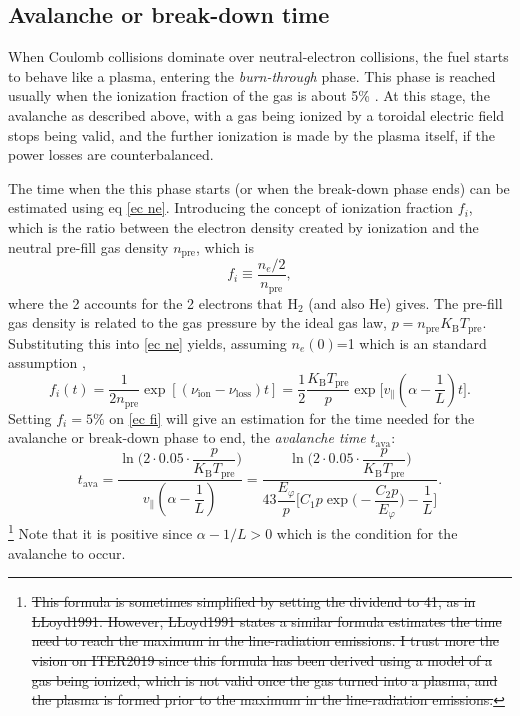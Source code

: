 \documentclass[a4paper,12pt,oneside]{book}
\begin{document}

\subsection{Avalanche or break-down time}

When Coulomb collisions dominate over neutral-electron collisions, the fuel starts to behave like a plasma, entering the \textit{burn-through} phase. This phase is reached usually when the ionization fraction of the gas is about 5\% \cite{ITER_2019}. At this stage, the avalanche as described above, with a gas being ionized by a toroidal electric field stops being valid, and the further ionization is made by the plasma itself, if the power losses are counterbalanced. 

The time when the this phase starts (or when the break-down phase ends) can be estimated using eq \eqref{ec ne}. Introducing the concept of ionization fraction $f_i$, which is the ratio between the electron density created by ionization and the neutral pre-fill gas density $n_\text{pre}$, which is
%
\begin{equation}
f_i \equiv \dfrac{n_e/2}{n_\text{pre}},
\end{equation} 
where the 2 accounts for the 2 electrons that H$_2$ (and also He) gives. The pre-fill gas density is related to the gas pressure by the ideal gas law, $p=n_\text{pre} K_\text{B} T_\text{pre}$. Substituting this into \eqref{ec ne} yields, assuming $n_e(0)$=1 which is an standard assumption \cite{ITER_2019, Lloyd_1991},
%
\begin{equation}\label{ec fi}
f_i(t)=\dfrac{1}{2 n_\text{pre}} \exp{ [(\nu_\text{ion}-\nu_\text{loss})t]}= \dfrac{1}{2} \dfrac{K_\text{B} T_\text{pre}}{p} \exp \Big[v_\parallel (\alpha-\dfrac{1}{L})t \Big].
\end{equation}
Setting $f_i=5\%$ on \eqref{ec fi} will give an estimation for the time needed for the avalanche or break-down phase to end, the \textit{avalanche time} $t_\text{ava}$:
%
\begin{equation}\label{ec t_ava}
t_\text{ava}= \dfrac{\ln \Big(2\cdot 0.05 \cdot \dfrac{p}{K_\text{B} T_\text{pre}} \Big) }{v_\parallel (\alpha-\dfrac{1}{L})}=\dfrac{\ln \Big(2\cdot 0.05 \cdot \dfrac{p}{K_\text{B} T_\text{pre}} \Big) }{43 \dfrac{E_\varphi}{p}\Big[ C_1 p \exp \Big(-\dfrac{C_2 p}{E_\varphi} \Big)-\dfrac{1}{L} \Big]}.
\end{equation}\footnote{\st{This formula is sometimes simplified by setting the dividend to 41, as in LLoyd1991. However, LLoyd1991 states a similar formula estimates the time need to reach the maximum in the line-radiation emissions. I trust more the vision on ITER2019 since this formula has been derived using a model of a gas being ionized, which is not valid once the gas turned into a plasma, and the plasma is formed prior to the maximum in the line-radiation emissions.}}
Note that it is positive since $\alpha-1/L>0$ which is the condition for the avalanche to occur.
\end{document}
